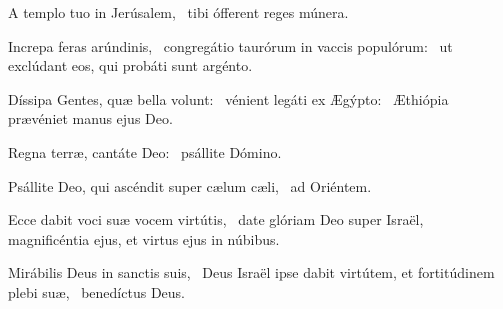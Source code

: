 \item A templo tuo in Jerúsalem,~\psstar{} tibi ófferent reges múnera.

\item Increpa feras arúndinis,~\pscross{} congregátio taurórum in vaccis populórum:~\psstar{} ut exclúdant eos, qui probáti sunt argénto.

\item Díssipa Gentes, quæ bella volunt:~\pscross{} vénient legáti ex Ægýpto:~\psstar{} Æthiópia prævéniet manus ejus Deo.

\item Regna terræ, cantáte Deo:~\psstar{} psállite Dómino.

\item Psállite Deo, qui ascéndit super cælum cæli,~\psstar{} ad Oriéntem.

\item Ecce dabit voci suæ vocem virtútis,~\pscross{} date glóriam Deo super Israël,~\psstar{} magnificéntia ejus, et virtus ejus in núbibus.

\item Mirábilis Deus in sanctis suis,~\pscross{} Deus Israël ipse dabit virtútem, et fortitúdinem plebi suæ,~\psstar{} benedíctus Deus.

